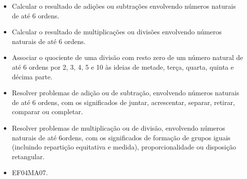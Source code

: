 
\begin{itemize}
\item Calcular o resultado de adições ou subtrações envolvendo números
naturais de até 6 ordens.
\item Calcular o resultado de multiplicações ou divisões envolvendo números
naturais de até 6 ordens.
\item Associar o quociente de uma divisão com resto zero de um número
natural de até 6 ordens por 2, 3, 4, 5 e 10 às ideias de metade, terça,
quarta, quinta e décima parte.
\item Resolver problemas de adição ou de subtração, envolvendo números
naturais de até 6 ordens, com os significados de juntar, acrescentar,
separar, retirar, comparar ou completar.
\item Resolver problemas de multiplicação ou de divisão, envolvendo números
naturais de até 6ordens, com os significados de formação de grupos
iguais (incluindo repartição equitativa e medida), proporcionalidade ou
disposição retangular.
\end{itemize}


\begin{itemize}
\item EF04MA07.
\end{itemize}


